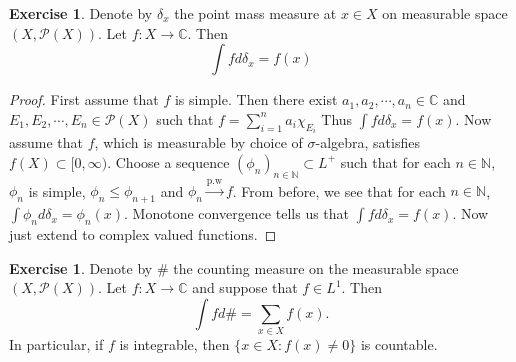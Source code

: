 \documentclass[12pt]{amsart}
\theoremstyle{definition}
\newtheorem{ex}[definition]{Exercise}
\newcommand{\del}{\delta}
\newcommand{\sig}{\sigma}
\newcommand{\C}{\mathbb{C}}
\newcommand{\N}{\mathbb{N}}
\newcommand{\MP}{\mathcal{P}}
\newcommand{\Rg}{[0,\infty)}
\begin{document}
	\begin{ex}
		Denote by $\del_x$ the point mass measure at $x \in X$ on  measurable space $(X, \MP(X))$. Let $f:X \rightarrow \C$. Then $$\int f d \del_x = f(x)$$  
	\end{ex}
	
	\begin{proof}
		First assume that $f$ is simple. Then there exist $a_1, a_2, \cdots, a_n \in \C$ and $E_1, E_2, \cdots , E_n \in \MP (X)$ such that $f = \sum_{i = 1}^n a_i\chi_{E_i}$ Thus $\int f d\del_x = f(x)$. Now assume that $f$, which is measurable by choice of $\sig$-algebra, satisfies $f(X) \subset \Rg$. Choose a sequence $(\phi_n)_{n \in \N} \subset L^+$ such that for each $n \in \N$, $\phi_n$ is simple, $\phi_n \leq \phi_{n+1}$ and $\phi_n \xrightarrow{\text{p.w}} f$. From before, we see that for each $n \in \N$, $\int \phi_n d\del_x = \phi_n(x)$. Monotone convergence tells us that $\int f d\del_x = f(x)$. Now just extend to complex valued functions.
		
	\end{proof}
	
	\begin{ex}
		Denote by $\#$ the counting measure on the measurable space $(X, \MP(X))$. Let $f:X \rightarrow \C$ and suppose that $f \in L^1$. Then $$\int f d\# = \sum_{x \in X}f(x).$$ In particular, if $f$ is integrable, then $\{x \in X: f(x) \neq 0\}$ is countable.
	\end{ex}
	
\end{document}
